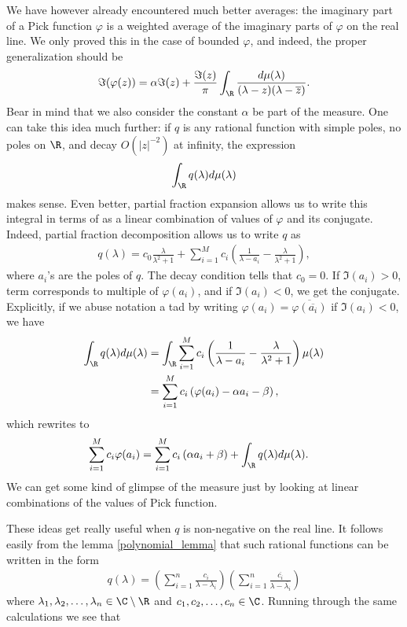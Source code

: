 We have however already encountered much better averages: the imaginary part of a Pick function $\varphi$ is a weighted average of the imaginary parts of $\varphi$ on the real line. We only proved this in the case of bounded $\varphi$, and indeed, the proper generalization should be 
\begin{align*}
	\Im(\varphi(z)) = \alpha \Im(z) + \frac{\Im(z)}{\pi}\int_{\R} \frac{d \mu(\lambda)}{(\lambda - z)(\lambda - \overline{z})}.
\end{align*}
Bear in mind that we also consider the constant $\alpha$ be part of the measure. One can take this idea much further: if $q$ is any rational function with simple poles, no poles on $\R$, and decay $O(|z|^{-2})$ at infinity, the expression
\begin{align*}
	\int_{\R} q(\lambda) d \mu(\lambda)
\end{align*}
makes sense. Even better, partial fraction expansion allows us to write this integral in terms of as a linear combination of values of $\varphi$ and its conjugate. Indeed, partial fraction decomposition allows us to write $q$ as
\begin{align*}
	q(\lambda) = c_{0}\frac{\lambda}{\lambda^2 + 1} + \sum_{i = 1}^{M} c_{i} \left(\frac{1}{\lambda - a_{i}} - \frac{\lambda}{\lambda^2 + 1}\right),
\end{align*}
where $a_{i}$'s are the poles of $q$. The decay condition tells that $c_{0} = 0$. If $\Im(a_{i}) > 0$, term corresponds to multiple of $\varphi(a_{i})$, and if $\Im(a_{i}) < 0$, we get the conjugate. Explicitly, if we abuse notation a tad by writing $\varphi(a_{i}) = \overline{\varphi(\overline{a_{i}})}$ if $\Im(a_{i}) < 0$, we have
\begin{align*}
	\int_{\R} q(\lambda) d \mu(\lambda) &= \int_{\R} \sum_{i = 1}^{M} c_{i} \left(\frac{1}{\lambda - a_{i}} - \frac{\lambda}{\lambda^2 + 1}\right)\mu(\lambda) \\
	&= \sum_{i = 1}^{M} c_{i} \left(\varphi(a_{i}) - \alpha a_{i} - \beta\right),
\end{align*}
which rewrites to
\begin{align*}
	\sum_{i = 1}^{M} c_{i} \varphi(a_{i}) &= \sum_{i = 1}^{M} c_{i} \left(\alpha a_{i} + \beta\right) + \int_{\R} q(\lambda) d \mu(\lambda).
\end{align*}
We can get some kind of glimpse of the measure just by looking at linear combinations of the values of Pick function.

These ideas get really useful when $q$ is non-negative on the real line. It follows easily from the lemma \ref{polynomial_lemma} that such rational functions can be written in the form
\begin{align*}
	q(\lambda) = \left( \sum_{i = 1}^{n} \frac{c_{i}}{\lambda - \lambda_{i}}\right) \left(\sum_{i = 1}^{n}\frac{\overline{c_{i}}}{\lambda - \overline{\lambda_{i}}}\right)
\end{align*}
where $\lambda_{1}, \lambda_{2}, \ldots, \lambda_{n} \in \C \setminus \R$ and $c_{1}, c_{2}, \ldots, c_{n} \in \C$. Running through the same calculations we see that

